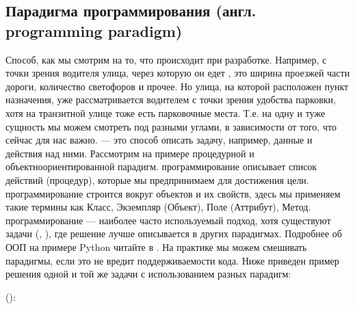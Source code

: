 \documentclass[letterpaper,10pt,russian]{sphinxmanual}
\begin{document}
\subsection{Парадигма программирования (англ. programming paradigm)}
\label{\detokenize{educational_materials/terms/content:programming-paradigm}}
\sphinxAtStartPar
Способ, как мы смотрим на то, что происходит при разработке. Например, с точки зрения водителя улица, через которую он едет , это ширина проезжей части дороги, количество светофоров и прочее. Но улица, на которой расположен пункт назначения, уже рассматривается водителем с точки зрения удобства парковки, хотя на транзитной улице тоже есть парковочные места. Т.е. на одну и туже сущность  мы можем смотреть под разными углами, в зависимости от того, что сейчас для нас важно.  — это способ описать задачу, например, данные и действия над ними.
Рассмотрим на примере процедурной и объектно\sphinxhyphen{}ориентированной парадигм.  программирование описывает список действий (процедур), которые мы предпринимаем для достижения цели.  программирование строится вокруг объектов и их свойств, здесь мы применяем такие термины как Класс, Экземпляр (Объект), Поле (Аттрибут), Метод.  программирование — наиболее часто используемый подход, хотя существуют задачи (, ), где решение лучше описывается в других парадигмах. Подробнее об ООП на примере Python читайте в . На практике мы можем смешивать парадигмы, если это не вредит поддерживаемости кода. Ниже приведен пример решения одной и той же задачи с использованием разных парадигм:

\sphinxAtStartPar
():
\end{document}
